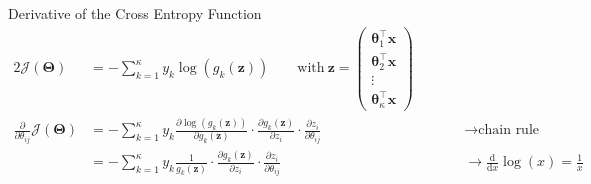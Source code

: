 \begin{frame}{Derivative of the Cross Entropy Function}{}\optional
	\footnotesize
	\begin{alignat*}{2}
		\mathcal{J}(\bm{\Theta})
			&= 	-\sum_{k=1}^{\kappa} y_k \log(g_k(\bm{z})) \qquad \text{with}\ \bm{z} =
				\begin{pmatrix}
					\bm{\theta}_{1}^{\intercal} \bm{x} \\
					\bm{\theta}_{2}^{\intercal} \bm{x} \\
					\vdots \\
					\bm{\theta}_{\kappa}^{\intercal} \bm{x}
				\end{pmatrix} 																				\\[4mm]
		\frac{\partial}{\partial \theta_{ij}} \mathcal{J}(\bm{\Theta})
			&= 	-\sum_{k=1}^{\kappa} y_k \frac{\partial \log(g_k(\bm{z}))}{\partial g_k(\bm{z})} \cdot
				\frac{\partial g_k(\bm{z})}{\partial z_i} \cdot \frac{\partial z_i}{\partial \theta_{ij}}
			&&	\qquad\longrightarrow \text{chain rule} 															\\[2mm]
			&= 	-\sum_{k=1}^{\kappa} y_k \frac{1}{g_k(\bm{z})} \cdot \frac{\partial g_k(\bm{z})}{\partial z_i} \cdot
				\frac{\partial z_i}{\partial \theta_{ij}}
			&&	\qquad\longrightarrow \frac{\text{d}}{\text{d}x} \log(x) = \frac{1}{x}
	\end{alignat*}
\end{frame}


